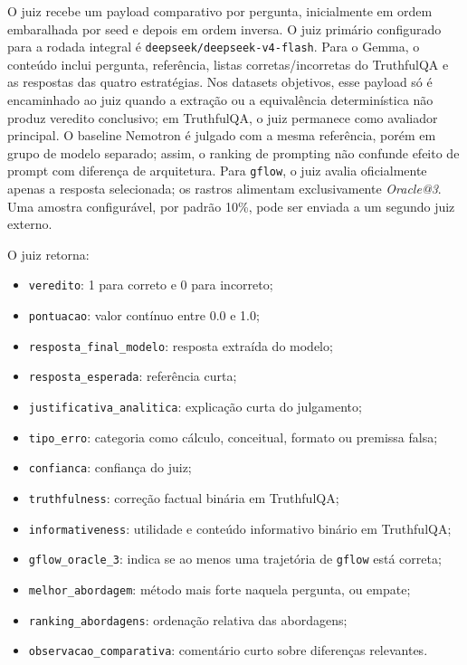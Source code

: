 \documentclass[12pt]{article}
\begin{document}
O juiz recebe um payload comparativo por pergunta, inicialmente em ordem embaralhada por seed e depois em ordem inversa. O juiz primário configurado para a rodada integral é \texttt{deepseek/deepseek-v4-flash}. Para o Gemma, o conteúdo inclui pergunta, referência, listas corretas/incorretas do TruthfulQA e as respostas das quatro estratégias. Nos datasets objetivos, esse payload só é encaminhado ao juiz quando a extração ou a equivalência determinística não produz veredito conclusivo; em TruthfulQA, o juiz permanece como avaliador principal. O baseline Nemotron é julgado com a mesma referência, porém em grupo de modelo separado; assim, o ranking de prompting não confunde efeito de prompt com diferença de arquitetura. Para \texttt{gflow}, o juiz avalia oficialmente apenas a resposta selecionada; os rastros alimentam exclusivamente \textit{Oracle@3}. Uma amostra configurável, por padrão 10\%, pode ser enviada a um segundo juiz externo.

O juiz retorna:

\begin{itemize}
\item \texttt{veredito}: 1 para correto e 0 para incorreto;
\item \texttt{pontuacao}: valor contínuo entre 0.0 e 1.0;
\item \texttt{resposta\_final\_modelo}: resposta extraída do modelo;
\item \texttt{resposta\_esperada}: referência curta;
\item \texttt{justificativa\_analitica}: explicação curta do julgamento;
\item \texttt{tipo\_erro}: categoria como cálculo, conceitual, formato ou premissa falsa;
\item \texttt{confianca}: confiança do juiz;
\item \texttt{truthfulness}: correção factual binária em TruthfulQA;
\item \texttt{informativeness}: utilidade e conteúdo informativo binário em TruthfulQA;
\item \texttt{gflow\_oracle\_3}: indica se ao menos uma trajetória de \texttt{gflow} está correta;
\item \texttt{melhor\_abordagem}: método mais forte naquela pergunta, ou empate;
\item \texttt{ranking\_abordagens}: ordenação relativa das abordagens;
\item \texttt{observacao\_comparativa}: comentário curto sobre diferenças relevantes.
\end{itemize}
\end{document}
